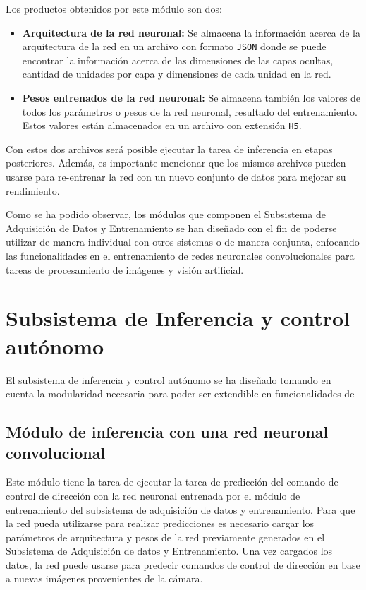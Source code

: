     Los productos obtenidos por este módulo son dos:
    
    \begin{itemize}
        \item \textbf{Arquitectura de la red neuronal:} Se almacena la información acerca de la arquitectura de la red en un archivo con formato \lstinline{JSON} donde se puede encontrar la información acerca de las dimensiones de las capas ocultas, cantidad de unidades por capa y dimensiones de cada unidad en la red.
        \item \textbf{Pesos entrenados de la red neuronal:} Se almacena también los valores de todos los parámetros o pesos de la red neuronal, resultado del entrenamiento. Estos valores están almacenados en un archivo con extensión \lstinline{H5}. 
    \end{itemize}

    Con estos dos archivos será posible ejecutar la tarea de inferencia en etapas posteriores. Además, es importante mencionar que 
    los mismos archivos pueden usarse para re-entrenar la red con un nuevo conjunto de datos para mejorar su rendimiento.

    Como se ha podido observar, los módulos que componen el Subsistema de Adquisición de Datos y Entrenamiento se han diseñado 
    con el fin de poderse utilizar de manera individual con otros sistemas o de manera conjunta, enfocando las funcionalidades 
    en el entrenamiento de redes neuronales convolucionales para tareas de procesamiento de imágenes y visión artificial.

\section{Subsistema de Inferencia y control autónomo}\label{sec:inferencia}
El subsistema de inferencia y control autónomo se ha diseñado tomando en cuenta la modularidad necesaria para poder ser 
extendible en funcionalidades de 
    \subsection{Módulo de inferencia con una red neuronal convolucional}
    Este módulo tiene la tarea de ejecutar la tarea de predicción del comando de control de dirección con la red neuronal 
    entrenada por el módulo de entrenamiento del subsistema de adquisición de datos y entrenamiento. Para que la red pueda 
    utilizarse para realizar predicciones es necesario cargar los parámetros de arquitectura y pesos de la red previamente 
    generados en el Subsistema de Adquisición de datos y Entrenamiento. Una vez cargados los datos, la red puede usarse 
    para predecir comandos de control de dirección en base a nuevas imágenes provenientes de la cámara.

